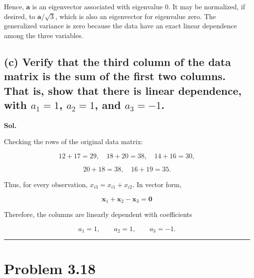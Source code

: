 \documentclass[12pt]{article}
\begin{document}
\vspace{0.2cm}

Hence, $\boldsymbol{a}$ is an eigenvector associated with eigenvalue $0$. It may be normalized, if desired, to $\boldsymbol{a}/\sqrt{3}$, which is also an eigenvector for eigenvalue zero. The generalized variance is zero because the data have an exact linear dependence among the three variables.

\subsection*{(c) Verify that the third column of the data matrix is the sum of the first two columns. That is, show that there is linear dependence, with $a_1=1$, $a_2=1$, and $a_3=-1$.}

\vspace{0.2cm}

\textbf{Sol.}

\vspace{0.2cm}

Checking the rows of the original data matrix:

\vspace{0.2cm}

\[
12+17=29,\quad
18+20=38,\quad
14+16=30,
\]

\vspace{0.2cm}

\[
20+18=38,\quad
16+19=35.
\]

\vspace{0.2cm}

Thus, for every observation, $x_{i3}=x_{i1}+x_{i2}$. In vector form,

\vspace{0.2cm}

\[
\boldsymbol{x}_1+\boldsymbol{x}_2-\boldsymbol{x}_3=\boldsymbol{0}
\]

\vspace{0.2cm}

Therefore, the columns are linearly dependent with coefficients

\vspace{0.2cm}

\[
\boxed{a_1=1,\qquad a_2=1,\qquad a_3=-1.}
\]

\vspace{0.2cm}

\vspace{0.7cm}
\hrule
\vspace{0.7cm}

\section*{Problem 3.18}
\end{document}
